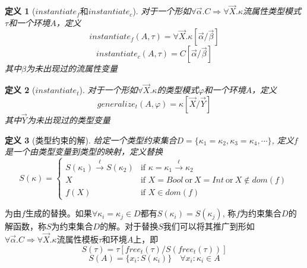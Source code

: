 \documentclass[UTF8, colorlinks]{pkuthss}
\newtheorem{definition}{定义}
\newcommand{\xto}{\xrightarrow}
\begin{document}
	\begin{definition}[$instantiate_f$和$instantiate_c$]
		对于一个形如$\forall\vec{\alpha}.C\Rightarrow\forall\vec{X}.\kappa$流属性类型模式$\tau$和一个环境$A$，定义$$instantiate_f(A, \tau) = \forall\vec{X}.\kappa[\vec{\alpha}/\vec{\beta}]$$$$instantiate_c(A, \tau)=C[\vec{\alpha}/\vec{\beta}]$$ 其中$\beta$为未出现过的流属性变量
	\end{definition}
	\begin{definition}[$instantiate_t$]
		对于一个形如$\forall\vec{X}.\kappa$的类型模式$\varphi$和一个环境$A$，定义$$generalize_t(A, \varphi) = \kappa[\vec{X}/\vec{Y}]$$ 其中$\vec{Y}$为未出现过的类型变量
	\end{definition}
	\begin{definition}[类型约束的解]
		给定一个类型约束集合$D = \{\kappa_1 = \kappa_2, \kappa_3 = \kappa_4, \cdots\}$, 定义$f$是一个由类型变量到类型的映射，定义替换
		\begin{equation*}
			S(\kappa) = 
			\begin{cases}
				S(\kappa_1)\xto{\ell}S(\kappa_2) & \text{if } \kappa = \kappa_1\xto{\ell}\kappa_2\\
				X & \text{if } X = Bool\ \text{or}\ X = Int\ \text{or}\ X\not\in dom(f)\\
				f(X) & \text{if } X\in dom(f)
			\end{cases}
		\end{equation*}
	\end{definition}
	为由$f$生成的替换。如果$\forall\kappa_i=\kappa_j\in D$都有$S(\kappa_i) = S(\kappa_j)$, 称$f$为约束集合$D$的解函数，称$S$为约束集合$D$的解。对于替换$S$我们可以将其推广到形如$\forall\vec{\alpha}.C\Rightarrow\forall\vec{X}.\kappa$流属性模板$\tau$和环境$A$上，即$$S(\tau) = \tau[free_t(\tau)/S(free_t(\tau))]$$$$S(A) = \{x_i:S(\kappa_i)\}\quad\forall x_i:\kappa_i\in A$$
	
\end{document}
